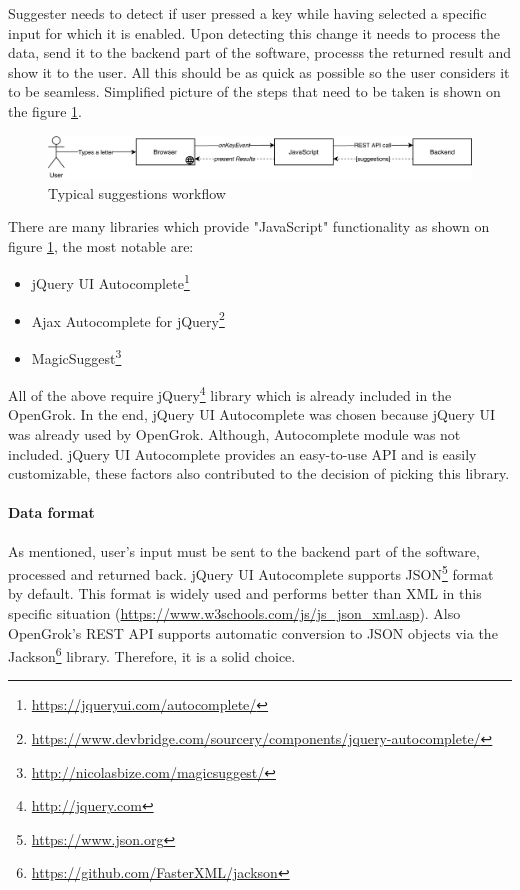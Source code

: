 Suggester needs to detect if user pressed a key while having selected a specific input for which it is enabled. Upon
detecting this change it needs to process the data, send it to the backend part of the software, processs the returned
result and show it to
the user. All this should be as quick as possible so the user considers it to be seamless. Simplified picture of the
steps that need to be taken is shown on the figure \ref{suggest_sequence}.

\begin{figure}[htbp]
\centering
\includegraphics[width=145mm]{../img/opengrok_sequence.pdf}
\caption{Typical suggestions workflow}
\label{suggest_sequence}
\end{figure}

There are many libraries which provide "JavaScript" functionality as shown on figure \ref{suggest_sequence},
the most notable are:
\begin{itemize}
    \item jQuery UI Autocomplete\footnote{\url{https://jqueryui.com/autocomplete/}}
    \item Ajax Autocomplete for jQuery\footnote{\url{https://www.devbridge.com/sourcery/components/jquery-autocomplete/}}
    \item MagicSuggest\footnote{\url{http://nicolasbize.com/magicsuggest/}}
\end{itemize}

All of the above require jQuery\footnote{\url{http://jquery.com}} library which is already included in the OpenGrok.
In the end, jQuery UI Autocomplete was chosen because jQuery UI was already used by OpenGrok. Although, Autocomplete
module was not included. jQuery UI Autocomplete provides an easy-to-use API and is easily customizable, these factors
also contributed to the decision of picking this library.

\paragraph{Data format}
As mentioned, user's input must be sent to the backend part of the software, processed and
returned back. jQuery UI Autocomplete supports JSON\footnote{\url{https://www.json.org}} format by default. This format
is widely used and performs better than XML in this
specific situation (\url{https://www.w3schools.com/js/js_json_xml.asp}). Also OpenGrok's REST API supports
automatic conversion to JSON objects via the Jackson\footnote{\url{https://github.com/FasterXML/jackson}} library.
Therefore, it is a solid choice.

